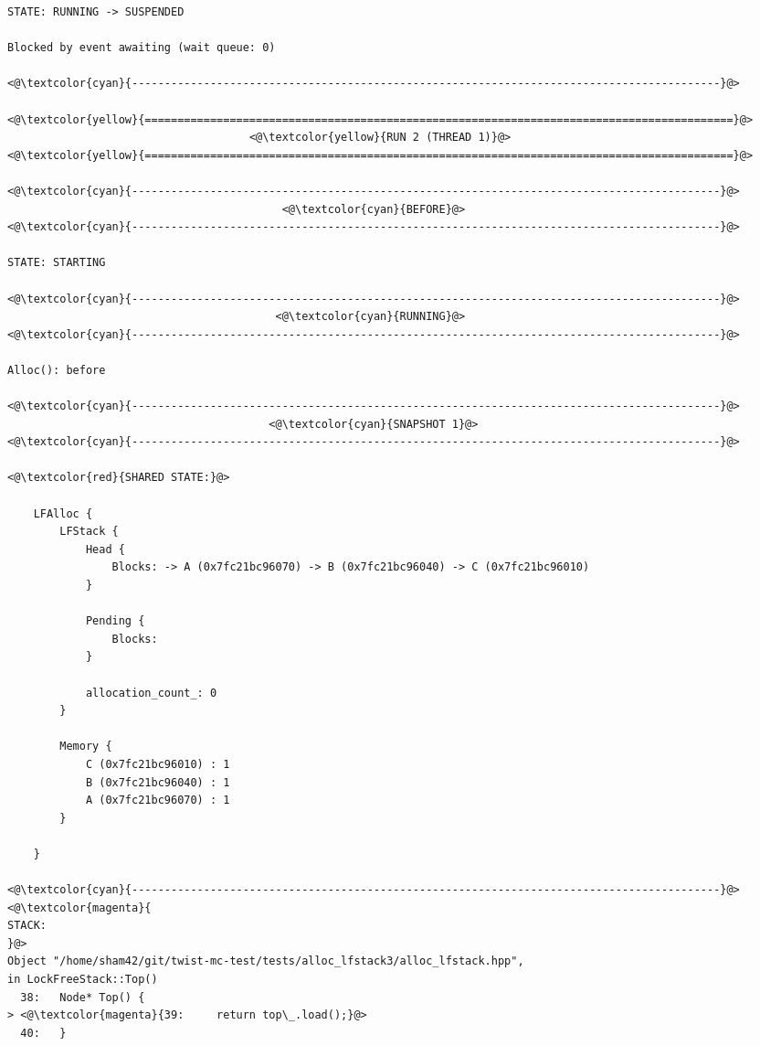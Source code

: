 \begin{adjustwidth}{-3.3cm}{-1cm}
\begin{allintypewriter}
\begin{multicols*}{2}
\begin{lstlisting}[numbers=none]
STATE: RUNNING -> SUSPENDED

Blocked by event awaiting (wait queue: 0)

<@\textcolor{cyan}{------------------------------------------------------------------------------------------}@>

<@\textcolor{yellow}{==========================================================================================}@>
                                     <@\textcolor{yellow}{RUN 2 (THREAD 1)}@>
<@\textcolor{yellow}{==========================================================================================}@>

<@\textcolor{cyan}{------------------------------------------------------------------------------------------}@>
                                          <@\textcolor{cyan}{BEFORE}@>
<@\textcolor{cyan}{------------------------------------------------------------------------------------------}@>

STATE: STARTING

<@\textcolor{cyan}{------------------------------------------------------------------------------------------}@>
                                         <@\textcolor{cyan}{RUNNING}@>
<@\textcolor{cyan}{------------------------------------------------------------------------------------------}@>

Alloc(): before

<@\textcolor{cyan}{------------------------------------------------------------------------------------------}@>
                                        <@\textcolor{cyan}{SNAPSHOT 1}@>
<@\textcolor{cyan}{------------------------------------------------------------------------------------------}@>

<@\textcolor{red}{SHARED STATE:}@>

    LFAlloc {
	    LFStack {
		    Head {
			    Blocks: -> A (0x7fc21bc96070) -> B (0x7fc21bc96040) -> C (0x7fc21bc96010) 
		    }

		    Pending {
			    Blocks: 
		    }

		    allocation_count_: 0
	    }

	    Memory {
		    C (0x7fc21bc96010) : 1
		    B (0x7fc21bc96040) : 1
		    A (0x7fc21bc96070) : 1
	    }

    }

<@\textcolor{cyan}{------------------------------------------------------------------------------------------}@>
<@\textcolor{magenta}{
STACK:
}@>
Object "/home/sham42/git/twist-mc-test/tests/alloc_lfstack3/alloc_lfstack.hpp",
in LockFreeStack::Top()
  38:   Node* Top() {
> <@\textcolor{magenta}{39:     return top\_.load();}@>
  40:   }


\end{lstlisting}
\end{multicols*}
\end{allintypewriter}
\end{adjustwidth}
